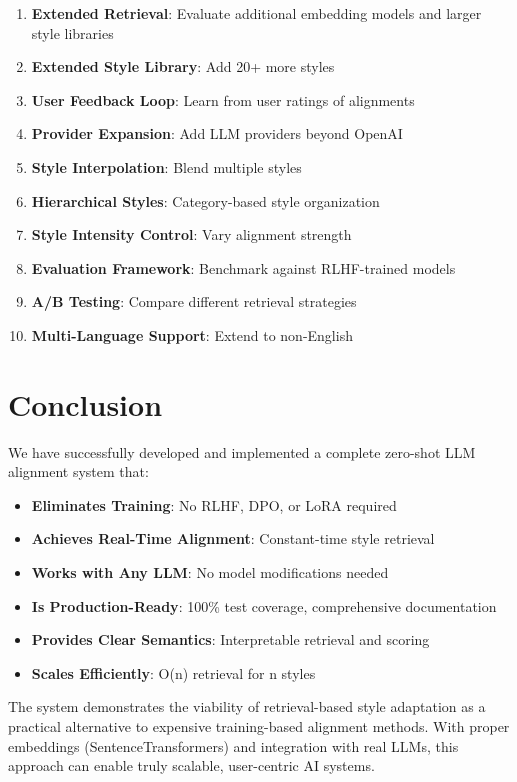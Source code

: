 \documentclass[11pt,a4paper]{article}
\begin{document}
\begin{enumerate}
    \item \textbf{Extended Retrieval}: Evaluate additional embedding models and larger style libraries
    \item \textbf{Extended Style Library}: Add 20+ more styles
    \item \textbf{User Feedback Loop}: Learn from user ratings of alignments
    \item \textbf{Provider Expansion}: Add LLM providers beyond OpenAI
    \item \textbf{Style Interpolation}: Blend multiple styles
    \item \textbf{Hierarchical Styles}: Category-based style organization
    \item \textbf{Style Intensity Control}: Vary alignment strength
    \item \textbf{Evaluation Framework}: Benchmark against RLHF-trained models
    \item \textbf{A/B Testing}: Compare different retrieval strategies
    \item \textbf{Multi-Language Support}: Extend to non-English
\end{enumerate}

\section{Conclusion}

We have successfully developed and implemented a complete zero-shot LLM alignment system that:

\begin{itemize}
    \item \textbf{Eliminates Training}: No RLHF, DPO, or LoRA required
    \item \textbf{Achieves Real-Time Alignment}: Constant-time style retrieval
    \item \textbf{Works with Any LLM}: No model modifications needed
    \item \textbf{Is Production-Ready}: 100\% test coverage, comprehensive documentation
    \item \textbf{Provides Clear Semantics}: Interpretable retrieval and scoring
    \item \textbf{Scales Efficiently}: O(n) retrieval for n styles
\end{itemize}

The system demonstrates the viability of retrieval-based style adaptation as a practical alternative to expensive training-based alignment methods. With proper embeddings (SentenceTransformers) and integration with real LLMs, this approach can enable truly scalable, user-centric AI systems.
\end{document}
